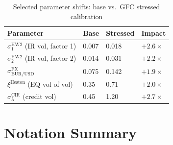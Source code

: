 \documentclass[11pt,a4paper]{article}
\begin{document}
\begin{table}[h!]
\centering
\begin{tabular}{@{}llll@{}}
\toprule
\textbf{Parameter} & \textbf{Base} & \textbf{Stressed} & \textbf{Impact} \\
\midrule
$\sigma_1^{\text{HW2}}$ (IR vol, factor 1) & 0.007 & 0.018 & $+2.6\times$ \\
$\sigma_2^{\text{HW2}}$ (IR vol, factor 2) & 0.014 & 0.031 & $+2.2\times$ \\
$\sigma^{\text{FX}}_{\text{EUR/USD}}$ & 0.075 & 0.142 & $+1.9\times$ \\
$\xi^{\text{Heston}}$ (EQ vol-of-vol) & 0.35  & 0.71  & $+2.0\times$ \\
$\sigma^{\text{CIR}}_\lambda$ (credit vol) & 0.45 & 1.20 & $+2.7\times$ \\
\bottomrule
\end{tabular}
\caption{Selected parameter shifts: base vs.\ GFC stressed calibration}
\end{table}

\section{Notation Summary}
\label{app:notation}
\end{document}
